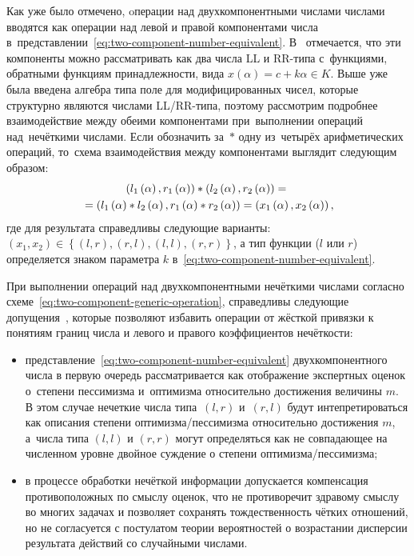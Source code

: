 Как уже было отмечено, oперации над двухкомпонентными числами числами вводятся как операции над левой и правой компонентами числа в~представлении~\eqref{eq:two-component-number-equivalent}. В~\cite{Kanischeva} отмечается, что эти компоненты можно рассматривать как два числа LL и RR-типа с~функциями, обратными функциям принадлежности, вида $x\left(\alpha \right)=c+k\alpha \in K$. Выше уже была введена алгебра типа поле для модифицированных чисел, которые структурно являются числами LL/RR-типа, поэтому рассмотрим подробнее взаимодействие между обеими компонентами при~выполнении операций над~нечёткими числами. Если обозначить за~$*$ одну из~четырёх арифметических операций, то~схема взаимодействия между компонентами выглядит следующим образом:
\begin{gather}
  \left( l_1\left(\alpha \right), r_1 \left(\alpha \right) \right) * \left(l_2\left(\alpha \right), r_2\left(\alpha \right) \right) = {}\notag \\
  \label{eq:two-component-generic-operation}
  {}=\left(l_1\left(\alpha \right)*l_2\left(\alpha \right), r_1\left(\alpha \right)*r_2\left(\alpha \right) \right) = \left(x_1\left(\alpha \right), x_2\left(\alpha \right) \right),
\end{gather}
где для результата справедливы следующие варианты: $\left(x_1, x_2 \right) \in \left\{ \left(l, r \right), \left(r, l \right),\allowbreak \left(l, l \right), \left(r, r \right) \right\}$, а тип функции ($l$ или $r$) определяется знаком параметра $k$ в~\eqref{eq:two-component-number-equivalent}.

При выполнении операций над двухкомпонентными нечёткими числами  согласно схеме~\eqref{eq:two-component-generic-operation}, справедливы следующие допущения~\cite{Kanischeva}, которые позволяют избавить операции от жёсткой привязки к понятиям границ числа и левого и правого коэффициентов нечёткости:
\begin{itemize}
  \item представление~\eqref{eq:two-component-number-equivalent} двухкомпонентного числа в первую очередь рассматривается как отображение экспертных оценок о~степени пессимизма и~оптимизма относительно достижения величины $m$. В этом случае нечеткие числа типа~$\left(l, r \right)$ и~$\left(r, l \right)$ будут интепретироваться как описания степени оптимизма/пессимизма относительно достижения $m$, а~числа типа $\left(l, l \right)$ и $\left(r, r \right)$ могут определяться как не совпадающее на численном уровне двойное суждение о степени оптимизма/пессимизма;
  \item в процессе обработки нечёткой информации допускается компенсация противоположных по смыслу оценок, что не противоречит здравому смыслу во многих задачах и позволяет сохранять тождественность чётких отношений, но не согласуется с постулатом теории вероятностей о возрастании дисперсии результата действий со случайными числами.
\end{itemize}

